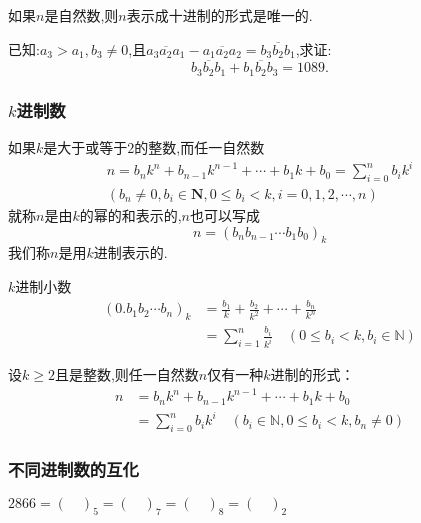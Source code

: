 \theorem 如果$n$是自然数,则$n$表示成十进制的形式是唯一的.

\example 已知:$a_{3}>a_{1},b_{3}\neq0$,且$\overline{a_{3}a_{2}a_{1}}-\overline{a_{1}a_{2}a_{2}}=\overline{b_{3}b_{2}b_{1}}$,求证:
\begin{equation*}
	\overline{b_{3}b_{2}b_{1}}+\overline{b_{1}b_{2}b_{3}}=1089.
\end{equation*}



\subsubsection{$k$进制数}
 如果$k$是大于或等于$2$的整数,而任一自然数
\begin{equation*}
	\begin{split}
		n=b_{n} k^{n}+b_{n-1} k^{n-1}+\cdots+b_{1} k+b_{0}=\sum_{i=0}^{n} b_{i} k^{i}\\
		(b_{n} \neq 0, b_{i} \in \mathbf{N},0 \leqslant b_{i}<k,i=0,1,2, \cdots, n)
	\end{split}
\end{equation*}
就称$n$是由$k$的幂的和表示的,$n$也可以写成
\begin{equation*}
	n=\left(b_{n} b_{n-1} \cdots b_{1} b_{0}\right)_{k}
\end{equation*}
我们称$n$是用$k$进制表示的.

 $k$进制小数
\begin{equation*}
	\begin{split}
		\left(0.b_{1} b_{2} \cdots b_{n}\right)_{k}&=\frac{b_{1}}{k}+\frac{b_{2}}{k^{2}}+\cdots+\frac{b_{n}}{k^{n}}\\
		&=\sum_{i=1}^{n} \frac{b_{i}}{k^{i}} \quad\left(0 \leqslant b_{i}<k, b_{i} \in \mathbb{N}\right)
	\end{split}
\end{equation*}

\theorem 设$k \geqslant 2$且是整数,则任一自然数$n$仅有一种$k$进制的形式：
\begin{equation*}
	\begin{aligned}
		n &=b_{n} k^{n}+b_{n-1} k^{n-1}+\cdots+b_{1} k+b_{0} \\
		&=\sum_{i=0}^{n} b_{i} k^{i} \quad\left(b_{i} \in \mathbb{N}, 0 \leqslant b_{i}<k, b_{n} \neq 0\right)
	\end{aligned}
\end{equation*}

\subsubsection{不同进制数的互化}
\example $2866 =(\quad)_{5}=(\quad)_{7}=(\quad)_{8}=(\quad)_{2}$

